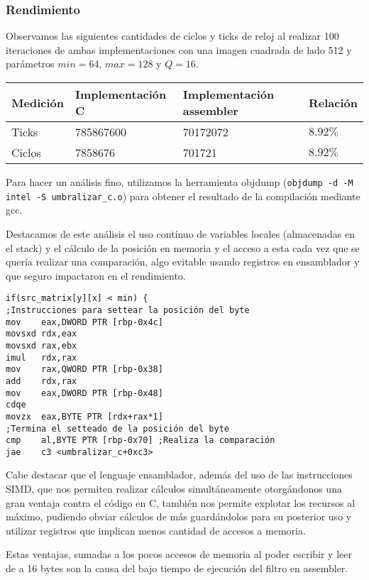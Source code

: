 \subsubsection{Rendimiento}
Observamos las siguientes cantidades de ciclos y ticks de reloj al realizar 100 iteraciones de ambas implementaciones con una imagen cuadrada de lado 512 y parámetros $min = 64$, $max = 128$ y $Q = 16$.
\begin{center}
    \begin{tabular}{|l|l|l|l|}
        \hline
        Medición & Implementación C & Implementación assembler & Relación \\
        \hline
        Ticks    & 785867600      & 70172072               & $8.92\%$ \\
        Ciclos   & 7858676        & 701721                & $8.92\%$ \\
        \hline
    \end{tabular}
\end{center}

Para hacer un análisis fino, utilizamos la herramienta objdump (\texttt{objdump -d -M intel -S umbralizar\_c.o}) para obtener el resultado de la compilación mediante gcc.

Destacamos de este análisis el uso contínuo de variables locales (almacenadas en el stack) y el cálculo de la posición en memoria y el acceso a esta cada vez que se quería realizar una comparación, algo evitable usando registros en ensamblador y que seguro impactaron en el rendimiento.

\begin{verbatim}
if(src_matrix[y][x] < min) {
;Instrucciones para settear la posición del byte
mov    eax,DWORD PTR [rbp-0x4c]
movsxd rdx,eax
movsxd rax,ebx
imul   rdx,rax
mov    rax,QWORD PTR [rbp-0x38]
add    rdx,rax
mov    eax,DWORD PTR [rbp-0x48]
cdqe   
movzx  eax,BYTE PTR [rdx+rax*1]
;Termina el setteado de la posición del byte
cmp    al,BYTE PTR [rbp-0x70] ;Realiza la comparación
jae    c3 <umbralizar_c+0xc3>
\end{verbatim}

Cabe destacar que el lenguaje ensamblador, además del uso de las instrucciones SIMD, que nos permiten realizar cálculos simultáneamente otorgándonos una gran ventaja contra el código en C, también nos permite explotar los recursos al máximo, pudiendo obviar cálculos de más guardándolos para su posterior uso y utilizar registros que implican menos cantidad de accesos a memoria.

Estas ventajas, sumadas a los pocos accesos de memoria al poder escribir y leer de a 16 bytes son la causa del bajo tiempo de ejecución del filtro en assembler.